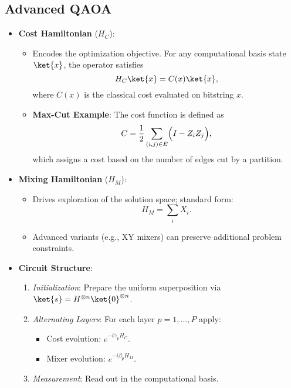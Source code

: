\begin{multicols}{3}
    \section*{Advanced QAOA}
    \begin{itemize}[leftmargin=*,nosep,topsep=0pt]
      \item \textbf{Cost Hamiltonian} ($H_C$):
        \begin{itemize}[nosep]
          \item Encodes the optimization objective. For any computational
            basis state \(\ket{x}\), the operator satisfies
            \[
              H_C \ket{x} = C(x) \ket{x},
            \]
            where \(C(x)\) is the classical cost evaluated on bitstring \(x\).
          \item \textbf{Max-Cut Example}: The cost function is defined as
            \[
              C = \frac{1}{2} \sum_{(i,j) \in E} \Bigl(I - Z_i Z_j\Bigr),
            \]
            which assigns a cost based on the number of edges cut by a partition.
        \end{itemize}
      \item \textbf{Mixing Hamiltonian} ($H_M$):
        \begin{itemize}[nosep]
          \item Drives exploration of the solution space; standard form:
            \[
              H_M = \sum_i X_i.
            \]
          \item Advanced variants (e.g., XY mixers) can preserve additional
            problem constraints.
        \end{itemize}
      \item \textbf{Circuit Structure}:
        \begin{enumerate}[nosep]
          \item \textit{Initialization}: Prepare the uniform superposition
            via \(\ket{s}=H^{\otimes n}\ket{0}^{\otimes n}\).
          \item \textit{Alternating Layers}: For each layer \(p=1,\dots,P\) apply:
            \begin{itemize}[nosep]
              \item Cost evolution: \(e^{-i\gamma_p H_C}\).
              \item Mixer evolution: \(e^{-i\beta_p H_M}\).
            \end{itemize}
          \item \textit{Measurement}: Read out in the computational basis.
        \end{enumerate}

\end{itemize}
\end{multicols}
